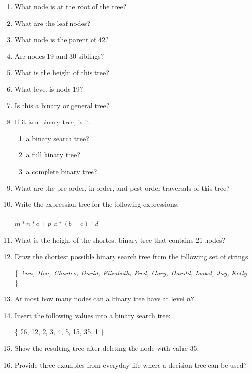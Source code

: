 \documentclass[11pt]{article}
\begin{document}
\begin{enumerate}

\item What node is at the root of the tree? {\color{red} }

\item What are the leaf nodes?

\item What node is the parent of 42?

\item Are nodes 19 and 30 siblings?

\item What is the height of this tree?

\item What level is node 19?

\item Is this a binary or general tree?

\item If it is a binary tree, is it

\begin{enumerate}

\item a binary search tree?

\item a full binary tree?

\item a complete binary tree?

\end{enumerate}

\item What are the pre-order, in-order, and post-order traversals of this tree?

\item {Write the expression tree for the following expressions: \\ \\
$m * n * o + p$ \hspace*{3in}$a * (b + c) * d$
}

\pagebreak
\item What is the height of the shortest binary tree that contains 21 nodes?

\item Draw the shortest possible binary search tree from the following set of strings 
\begin{center}\{ {\it Ann, Ben, Charles, David, Elizabeth, Fred, Gary, Harold, Isabel, Jay, Kelly} \}\end{center}

\item At most how many nodes can a binary tree have at level $n$?

\item Insert the following values into a binary search tree:
\begin{center} \{ 26, 12, 2, 3, 4, 5, 15, 35, 1 \} \end{center}

\item Show the resulting tree after deleting the node with value 35.

\item Provide three examples from everyday life where a decision tree can be used?

\end{enumerate}


 
\end{document}

